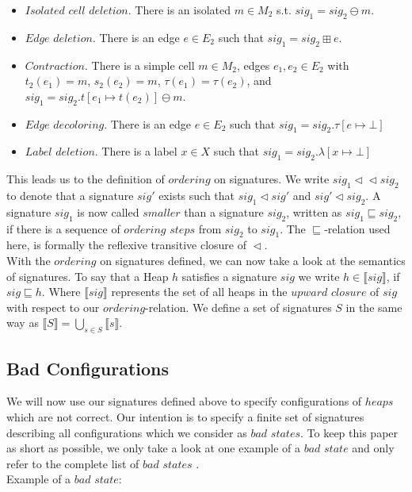 \begin{itemize}

	\item $Isolated$ $cell$ $deletion$. There is an isolated $m \in M_2$ s.t. $sig_1 = sig_2 \ominus m$.
	\item $Edge$ $deletion$. There is an edge $e \in E_2$ such that $sig_1 = sig_2 \boxplus e$.
	\item $Contraction$. There is a simple cell $m \in M_2$, edges $e_1,e_2 \in E_2$ with $t_2(e_1) = m$,
		  $s_2(e_2) = m$, $\tau(e_1) = \tau(e_2)$, and $sig_1 = sig_2.t[e_1 \mapsto t(e_2)] \ominus m$. 
	\item $Edge$ $decoloring$. There is an edge $e \in E_2$ such that $sig_1 = sig_2.\tau[e \mapsto \bot]$
	\item $Label$ $deletion$. There is a label $x \in X$ such that $sig_1 = sig_2.\lambda[x \mapsto \bot]$

\end{itemize}
\noindent
This leads us to the definition of $ordering$ on signatures. We write $sig_1 \vartriangleleft \vartriangleleft sig_2$ to denote
that a signature $sig'$ exists such that $sig_1 \vartriangleleft sig'$ and $sig' \vartriangleleft sig_2$.
A signature $sig_1$ is now called $smaller$ than a signature $sig_2$, written as $sig_1 \sqsubseteq sig_2$, if there is
a sequence of $ordering$ $steps$ from $sig_2$ to $sig_1$. The $\sqsubseteq$-relation used here, is formally the reflexive transitive
closure of $\vartriangleleft$.\\
With the $ordering$ on signatures defined, we can now take a look at the semantics of signatures.
To say that a Heap $h$ satisfies a signature $sig$ we write $h \in \llbracket sig \rrbracket$, if $sig \sqsubseteq h$.
Where $\llbracket sig \rrbracket$ represents the set of all heaps in the $upward$ $closure$ of $sig$ with respect to our
$ordering$-relation. We define a set of signatures $S$ in the same way as 
$\llbracket S \rrbracket = \bigcup_{s \in S} \llbracket s \rrbracket$.

\subsection{Bad Configurations}
We will now use our signatures defined above to specify configurations of $heaps$ which are not correct. 
Our intention is to specify a finite set of signatures describing all configurations which we consider as $bad$ $states$.
To keep this paper as short as possible, we only take a look at one example of a $bad$ $state$ and only refer to the complete
list of $bad$ $states$ \cite{abdulla2013monotonic}.\\
Example of a $bad$ $state$:

